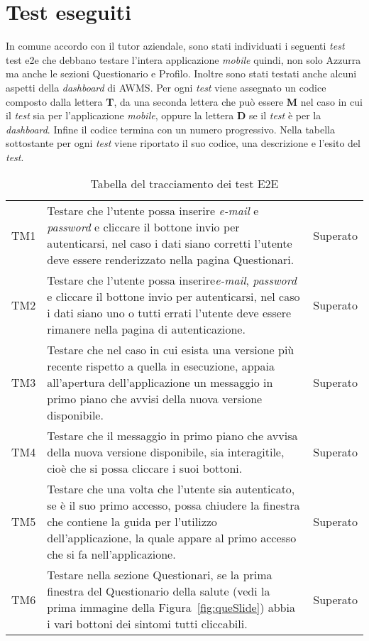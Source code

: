 \section{Test eseguiti}
In comune accordo con il tutor aziendale, sono stati individuati i seguenti \emph{test} \gls{test e2e} che debbano testare l'intera applicazione \emph{mobile} quindi, non solo Azzurra ma anche le sezioni Questionario e Profilo. Inoltre sono stati testati anche alcuni aspetti della \emph{dashboard} di \gls{AWMS}. Per ogni \emph{test} viene assegnato un codice composto dalla lettera \textbf{T}, da una seconda lettera che può essere \textbf{M} nel caso in cui il \emph{test} sia per l'applicazione \emph{mobile}, oppure la lettera \textbf{D} se il \emph{test} è per la \emph{dashboard}. Infine il codice termina con un numero progressivo. Nella tabella sottostante per ogni \emph{test} viene riportato il suo codice, una descrizione e l'esito del \emph{test}.
\begin{table}[h]%
	\renewcommand{\arraystretch}{1.4}
	\centering
	\begin{tabularx}{\textwidth}{c X c}
		\hline	
		\rowcolor{heavenly}
		\intest{Codice} &  \intest{Descrizione} & \intest{Esito}\\	
		\hline			
		TM1 & Testare che l'utente possa inserire \emph{e-mail} e \emph{password} e cliccare il bottone invio per autenticarsi, nel caso i dati siano corretti l'utente deve essere renderizzato nella pagina Questionari. & Superato\\
		TM2 & Testare che l'utente possa inserire\emph{e-mail}, \emph{password} e cliccare il bottone invio per autenticarsi, nel caso i dati siano uno o tutti errati l'utente deve essere rimanere nella pagina di autenticazione. & Superato\\
		TM3 & Testare che nel caso in cui esista una versione più recente rispetto a quella in esecuzione, appaia all'apertura dell'applicazione un messaggio in primo piano che avvisi della nuova versione disponibile. & Superato\\
		TM4 & Testare che il messaggio in primo piano che avvisa della nuova versione disponibile, sia interagitile, cioè che si possa cliccare i suoi bottoni. & Superato\\
		TM5 & Testare che una volta che l'utente sia autenticato, se è il suo primo accesso, possa chiudere la finestra che contiene la guida per l'utilizzo dell'applicazione, la quale appare al primo accesso che si fa nell'applicazione. & Superato\\
		TM6 & Testare nella sezione Questionari, se la prima finestra del Questionario della salute (vedi la prima immagine della Figura~\ref{fig:queSlide}) abbia i vari bottoni dei sintomi tutti cliccabili. & Superato\\
		\hline
	\end{tabularx} \hbox{}
	\caption{Tabella del tracciamento dei test E2E}
\end{table}%
	
